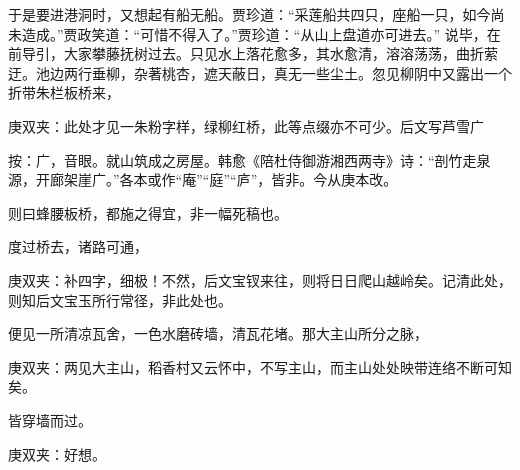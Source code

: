 \begin{parag}
    于是要进港洞时，又想起有船无船。贾珍道：“采莲船共四只，座船一只，如今尚未造成。”贾政笑道：“可惜不得入了。”贾珍道：“从山上盘道亦可进去。” 说毕，在前导引，大家攀藤抚树过去。只见水上落花愈多，其水愈清，溶溶荡荡，曲折萦迂。池边两行垂柳，杂著桃杏，遮天蔽日，真无一些尘土。忽见柳阴中又露出一个折带朱栏板桥来，\begin{note}庚双夹：此处才见一朱粉字样，绿柳红桥，此等点缀亦不可少。后文写芦雪广\end{note}\begin{subnote}按：广，音眼。就山筑成之房屋。韩愈《陪杜侍御游湘西两寺》诗：“剖竹走泉源，开廊架崖广。”各本或作“庵”“庭”“庐”，皆非。今从庚本改。\end{subnote}\begin{note}则曰蜂腰板桥，都施之得宜，非一幅死稿也。\end{note}度过桥去，诸路可通，\begin{note}庚双夹：补四字，细极！不然，后文宝钗来往，则将日日爬山越岭矣。记清此处，则知后文宝玉所行常径，非此处也。\end{note}便见一所清凉瓦舍，一色水磨砖墙，清瓦花堵。那大主山所分之脉，\begin{note}庚双夹：两见大主山，稻香村又云怀中，不写主山，而主山处处映带连络不断可知矣。\end{note}皆穿墙而过。\begin{note}庚双夹：好想。\end{note}
\end{parag}


